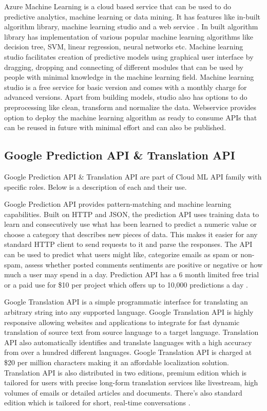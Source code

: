     Azure Machine Learning is a cloud based service that can be used
    to do predictive analytics, machine learning or data mining. It
    has features like in-built algorithm library, machine learning
    studio and a web service \cite{www-azureMLSite}. In built
    algorithm library has implementation of various popular machine
    learning algorithms like decision tree, SVM, linear regression,
    neural networks etc. Machine learning studio facilitates creation
    of predictive models using graphical user interface by dragging,
    dropping and connecting of different modules that can be used by
    people with minimal knowledge in the machine learning
    field. Machine learning studio is a free service for basic version
    and comes with a monthly charge for advanced versions. Apart from
    building models, studio also has options to do preprocessing like
    clean, transform and normalize the data. Webservice provides
    option to deploy the machine learning algorithm as ready to
    consume APIs that can be reused in future with minimal effort and
    can also be published.
    
\subsection{Google Prediction API \& Translation API}

    Google Prediction API \& Translation API are part of Cloud ML API
    family with specific roles. Below is a description of each and
    their use.

    Google Prediction API provides pattern-matching and machine
    learning capabilities. Built on HTTP and JSON, the prediction API
    uses training data to learn and consecutively use what has been
    learned to predict a numeric value or choose a category that
    describes new pieces of data. This makes it easier for any
    standard HTTP client to send requests to it and parse the
    responses. The API can be used to predict what users might like,
    categorize emails as spam or non-spam, assess whether posted
    comments sentiments are positive or negative or how much a user
    may spend in a day. Prediction API has a 6 month limited free
    trial or a paid use for \$10 per project which offers up to 10,000
    predictions a day \cite{www-prediction}.

    Google Translation API is a simple programmatic interface for
    translating an arbitrary string into any supported
    language. Google Translation API is highly responsive allowing
    websites and applications to integrate for fast dynamic
    translation of source text from source language to a target
    language. Translation API also automatically identifies and
    translate languages with a high accuracy from over a hundred
    different languages.  Google Translation API is charged at \$20 per
    million characters making it an affordable localization
    solution. Translation API is also distributed in two editions,
    premium edition which is tailored for users with precise long-form
    translation services like livestream, high volumes of emails or
    detailed articles and documents. There’s also standard edition
    which is tailored for short, real-time
    conversations \cite{www-translation}.

